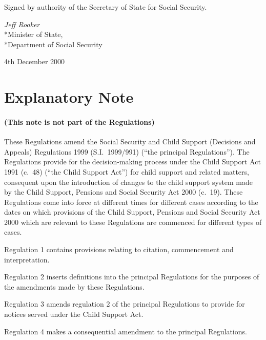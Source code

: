 \documentclass[12pt,a4paper]{article}
\begin{document}

\bigskip

Signed 
by authority of the Secretary of State for Social Security.

{\raggedleft
\emph{Jeff Rooker}\\*Minister of State,\\*Department of Social Security

}

4th December 2000

\small

\part{Explanatory Note}

\renewcommand\parthead{--- Explanatory Note}

\subsection*{(This note is not part of the Regulations)}

These Regulations amend the Social Security and Child Support (Decisions and Appeals) Regulations 1999 (S.I.\ 1999/991) (“the principal Regulations”). The Regulations provide for the decision-making process under the Child Support Act 1991 (c.\ 48) (“the Child Support Act”) for child support and related matters, consequent upon the introduction of changes to the child support system made by the Child Support, Pensions and Social Security Act 2000 (c.\ 19). These Regulations come into force at different times for different cases according to the dates on which provisions of the Child Support, Pensions and Social Security Act 2000 which are relevant to these Regulations are commenced for different types of cases.

Regulation 1 contains provisions relating to citation, commencement and interpretation.

Regulation 2 inserts definitions into the principal Regulations for the purposes of the amendments made by these Regulations.

Regulation 3 amends regulation 2 of the principal Regulations to provide for notices served under the Child Support Act.

Regulation 4 makes a consequential amendment to the principal Regulations.
\end{document}
